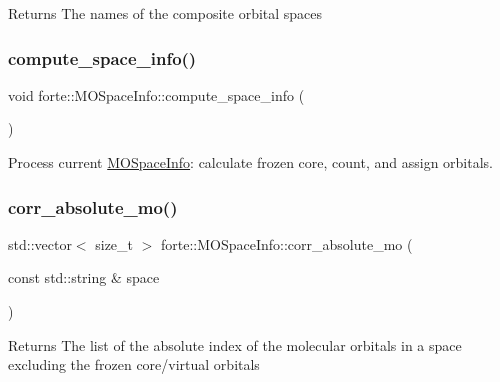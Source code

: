 \begin{DoxyReturn}{Returns}
The names of the composite orbital spaces 
\end{DoxyReturn}
\mbox{\label{classforte_1_1_m_o_space_info_aa41897ba003dab2da7e902e6e2198bd1}} 
\subsubsection{\texorpdfstring{compute\+\_\+space\+\_\+info()}{compute\_space\_info()}}
{\footnotesize\ttfamily void forte\+::\+M\+O\+Space\+Info\+::compute\+\_\+space\+\_\+info (\begin{DoxyParamCaption}{ }\end{DoxyParamCaption})}



Process current \mbox{\hyperlink{classforte_1_1_m_o_space_info}{M\+O\+Space\+Info}}\+: calculate frozen core, count, and assign orbitals. 

\mbox{\label{classforte_1_1_m_o_space_info_ad7d1a1daec658c71eff4c20688fc4bd1}} 
\subsubsection{\texorpdfstring{corr\+\_\+absolute\+\_\+mo()}{corr\_absolute\_mo()}}
{\footnotesize\ttfamily std\+::vector$<$ size\+\_\+t $>$ forte\+::\+M\+O\+Space\+Info\+::corr\+\_\+absolute\+\_\+mo (\begin{DoxyParamCaption}\item[{const std\+::string \&}]{space }\end{DoxyParamCaption})}

\begin{DoxyReturn}{Returns}
The list of the absolute index of the molecular orbitals in a space excluding the frozen core/virtual orbitals 
\end{DoxyReturn}
\mbox{\label{classforte_1_1_m_o_space_info_a99541e74c30572a6e2cf87e2a6fb7ebd}} 
